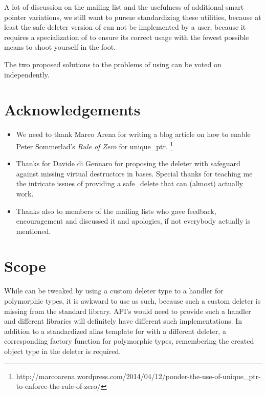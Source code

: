 \documentclass[ebook,11pt,article]{memoir}
\begin{document}
A lot of discussion on the mailing list and the usefulness of additional smart pointer variations, we still want to pursue standardizing these utilities, because at least the safe deleter version of  can not be implemented by a user, because it requires a specialization of  to ensure its correct usage with the fewest possible means to shoot yourself in the foot.

The two proposed solutions to the problems of using  can be voted on independently.

\chapter{Acknowledgements}
\begin{itemize}
\item We need to thank Marco Arena for writing a blog article on how to enable Peter Sommerlad's \emph{Rule of Zero} for unique_ptr. 
\footnote{{http://marcoarena.wordpress.com/2014/04/12/ponder-the-use-of-unique_ptr-to-enforce-the-rule-of-zero/}}
\item Thanks for Davide di Gennaro for proposing the deleter with safeguard against missing virtual destructors in bases. Special thanks for teaching me the intricate issues of providing a safe_delete that can (almost) actually work.
\item Thanks also to members of the mailing lists who gave feedback, encouragement and discussed it and apologies, if not everybody actually is mentioned.
\end{itemize}

\chapter{Scope}

While  can be tweaked by using a custom deleter type to a handler for polymorphic types, it is awkward to use as such, because such a custom deleter is missing from the standard library. API's would need to provide such a handler and different libraries will definitely have different such implementations. In addition to a standardized alias template for  with a different deleter, a corresponding factory function for polymorphic types, remembering the created object type in the deleter is required.
\end{document}
